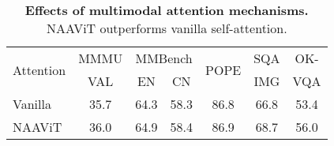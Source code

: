 \begin{table}[t]
  \centering
    \scalebox{0.8}
    {
    \begin{tabular}{l|cccccc}
    \toprule
    \multirow{2}[2]{*}{Attention}  & MMMU & \multicolumn{2}{c}{MMBench} & \multirow{2}[2]{*}{POPE}  & SQA & OK- \\
        & VAL & EN & CN        &             & IMG & VQA \\
    \midrule
    Vanilla  & 35.7  & 64.3 & 58.3  & 86.8  & 66.8 & 53.4  \\
    \rowcolor{cyan!20} NAAViT & 36.0 & 64.9 & 58.4 & 86.9 & 68.7 & 56.0  \\
    \bottomrule
    \end{tabular}
    }
    \caption{\textbf{Effects of multimodal attention mechanisms.}
    NAAViT outperforms vanilla self-attention.
    }
  \label{tab:attention}
\end{table}


